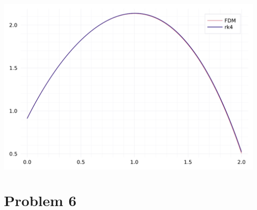 \documentclass[12pt,a4paper]{article}
\begin{document}
\includegraphics[width=\linewidth]{figures/ass_4_report_9_1.pdf}

\section{Problem 6}
\end{document}
